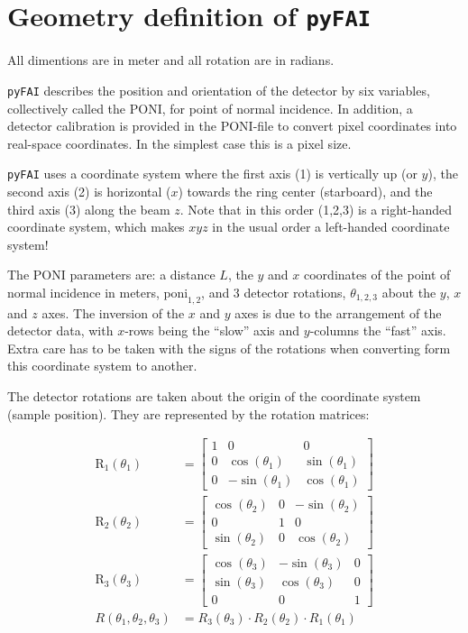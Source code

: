 \documentclass[12pt]{article}
\begin{document}
\section{Geometry definition of \texttt{pyFAI}}

All dimentions are in meter and all rotation are in radians.

\texttt{pyFAI} describes the position and orientation of the detector
by six variables, collectively called the PONI, for point of normal
incidence. In addition, a detector calibration is provided in the
PONI-file to convert pixel coordinates into real-space coordinates. In
the simplest case this is a pixel size.

\texttt{pyFAI} uses a coordinate system where the first axis (1)  is
vertically up (or $y$), the second axis (2) is horizontal ($x$) towards the ring
center (starboard), and the third axis (3) along the beam $z$. Note that
in this order (1,2,3) is a right-handed coordinate system, which makes
$xyz$ in the usual order a left-handed coordinate system!

The PONI parameters are: a distance $L$, the $y$ and $x$ coordinates
of the point of normal incidence in meters, $\mathrm{poni}_{1,2}$, and
3 detector rotations, $\theta_{1,2,3}$ about the $y$, $x$ and $z$
axes. The inversion of the $x$ and $y$ axes is due to the arrangement
of the detector data, with $x$-rows being the ``slow'' axis and
$y$-columns the ``fast'' axis. Extra care has to be taken with the
signs of the rotations when converting form this coordinate system to
another.

The detector rotations are taken about the origin of the coordinate
system (sample position). They are represented by the rotation
matrices:

\begin{align}
  \mathrm{R}_1(\theta_1)
  & =
  \begin{bmatrix}
    1 & 0 & 0 \\
    0 & \cos(\theta_1) & \sin(\theta_1) \\
    0 & -\sin(\theta_1) & \cos(\theta_1)
  \end{bmatrix}
  \\
  \mathrm{R}_2(\theta_2)
  & =
  \begin{bmatrix}
    \cos(\theta_2) & 0 & -\sin(\theta_2) \\
    0 & 1 & 0 \\
    \sin(\theta_2) & 0 & \cos(\theta_2)
  \end{bmatrix}
  \\
  \mathrm{R}_3(\theta_3)
  & =
  \begin{bmatrix}
    \cos(\theta_3) & -\sin(\theta_3) & 0\\
    \sin(\theta_3) & \cos(\theta_3) & 0\\
    0 & 0 & 1
  \end{bmatrix}
  \\
  R(\theta_1, \theta_2, \theta_3)
  & =
  R_3(\theta_3) \cdot R_2(\theta_2) \cdot R_1(\theta_1)
\end{align}
\end{document}
